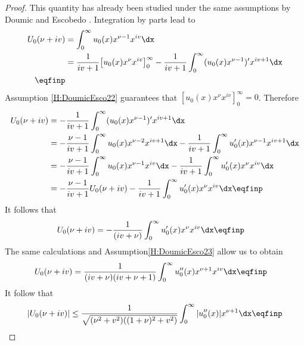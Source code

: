 \begin{proof}
    This quantity has already been studied under the same assumptions by Doumic and Escobedo \cite{doumic2016time}. Integration by parts lead to 
        \begin{align*}
            U_0(\nu + i v) 
            &= \int_0^\infty u_0(x) x^{\nu-1}x^{i v}\dx \\
            &= \frac{1}{iv + 1} \big[ u_0(x) x^{\nu} x^{i v} \big]_0^\infty - \frac{1}{iv + 1} \int_0^\infty (u_0(x) x^{\nu-1})' x^{i v+1}\dx \\
            \eqfinp
        \end{align*}
    Assumption \eqref{H:DoumicEsco22} guarantees that $[ u_0(x) x^{\nu} x^{i v} ]_0^\infty = 0$. Therefore
        \begin{align*}
            U_0(\nu + i v) 
            &= - \frac{1}{iv + 1} \int_0^\infty (u_0(x) x^{\nu-1})' x^{i v+1}\dx \\
            &= - \frac{\nu - 1}{iv + 1} \int_0^\infty u_0(x) x^{\nu-2} x^{i v + 1}\dx  - \frac{1}{iv + 1} \int_0^\infty u_0'(x) x^{\nu-1} x^{i v + 1}\dx \\
            &= - \frac{\nu - 1}{iv + 1} \int_0^\infty u_0(x) x^{\nu-1} x^{i v}\dx  - \frac{1}{iv + 1} \int_0^\infty u_0'(x) x^{\nu} x^{i v}\dx \\
            &= - \frac{\nu - 1}{iv + 1} U_0(\nu + i v)   - \frac{1}{iv + 1} \int_0^\infty u_0'(x) x^{\nu} x^{i v}\dx
            \eqfinp
        \end{align*}
    It follows that 
        \begin{align*}
            U_0(\nu + i v)
            &= - \frac{1}{(iv + \nu)}\int_0^\infty u_0'(x) x^{\nu} x^{i v}\dx
            \eqfinp
        \end{align*}
    The same calculations and Assumption\eqref{H:DoumicEsco23} allow us to obtain 
        \begin{align*}
            U_0(\nu + i v)
            &=  \frac{1}{(iv + \nu)(iv + \nu + 1)}\int_0^\infty u_0''(x) x^{\nu + 1} x^{i v}\dx
            \eqfinp
        \end{align*}
    It follow that 
        \begin{equation*}
            |U_0(\nu + i v)| \leq \frac{1}{\sqrt{(\nu^2 + v^2)((1+\nu)^2 + v^2)}} \int_0^\infty |u_0''(x)| x^{\nu + 1} \dx
            \eqfinp
        \end{equation*}
    

\end{proof}
